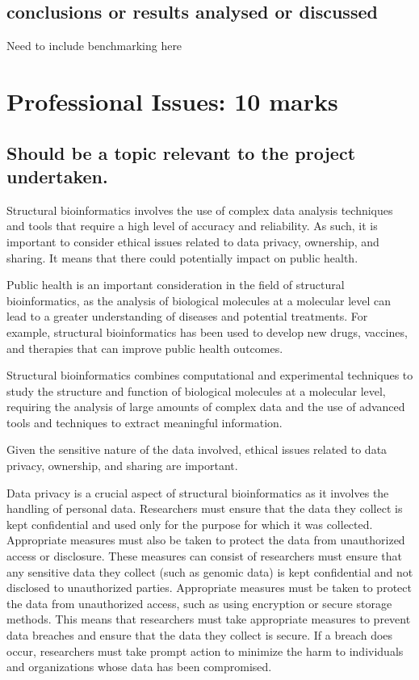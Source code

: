 \documentclass[]{final_report}
\begin{document}
\subsection{conclusions or results analysed or discussed}
Need to include benchmarking here

\section{Professional Issues: 10 marks}
\subsection{Should be a topic relevant to the project undertaken.}
Structural bioinformatics involves the use of complex data analysis techniques and tools that require a high level of accuracy and reliability. As such, it is important to consider ethical issues related to data privacy, ownership, and sharing. It means that there could potentially impact on public health.

Public health is an important consideration in the field of structural bioinformatics, as the analysis of biological molecules at a molecular level can lead to a greater understanding of diseases and potential treatments. For example, structural bioinformatics has been used to develop new drugs, vaccines, and therapies that can improve public health outcomes.

Structural bioinformatics combines computational and experimental techniques to study the structure and function of biological molecules at a molecular level, requiring the analysis of large amounts of complex data and the use of advanced tools and techniques to extract meaningful information.

Given the sensitive nature of the data involved, ethical issues related to data privacy, ownership, and sharing are important. 

Data privacy is a crucial aspect of structural bioinformatics as it involves the handling of personal data. Researchers must ensure that the data they collect is kept confidential and used only for the purpose for which it was collected. Appropriate measures must also be taken to protect the data from unauthorized access or disclosure. These measures can consist of researchers must ensure that any sensitive data they collect (such as genomic data) is kept confidential and not disclosed to unauthorized parties. Appropriate measures must be taken to protect the data from unauthorized access, such as using encryption or secure storage methods. This means that researchers must take appropriate measures to prevent data breaches and ensure that the data they collect is secure. If a breach does occur, researchers must take prompt action to minimize the harm to individuals and organizations whose data has been compromised.
\end{document}
